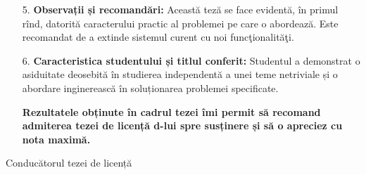 \begin{titlepage}
\begin{flushleft}
\begin{enumerate}[leftmargin=1.4em, itemsep=1pt, parsep=0pt]
        \item [5.] \textbf{Observații și recomandări:} Această teză se face evidentă, în primul rînd, datorită caracterului practic al problemei pe care o abordează. Este recomandat de a extinde sistemul curent cu noi funcţionalităţi.
        
        \item [6.] \textbf{Caracteristica studentului și titlul conferit:} Studentul a demonstrat o asiduitate deosebită în studierea independentă a unei teme netriviale și o abordare inginerească în soluționarea problemei specificate.
        
        \textbf{Rezultatele obținute în cadrul tezei îmi permit să recomand admiterea tezei de licență d-lui \MyName spre susținere și să o apreciez cu nota maximă.}
        
        \end{enumerate}
        
        \hfill Conducătorul tezei de licență\\
        \hfill \textbf{\Coordonator}\\

    \end{flushleft}
    \vfill
\end{titlepage}